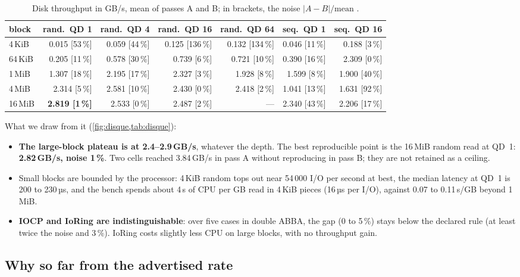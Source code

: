 \begin{table}[ht]
\centering\small
\caption[Disk throughput, excerpt of the ABBA sweep]{Disk throughput in GB/s, mean of passes A and B; in brackets, the noise $|A-B|/\text{mean}$ \mes.}
\label{tab:disque}
\begin{tabular}{@{}lrrrrrr@{}}
\toprule
block & rand.\ QD 1 & rand.\ QD 4 & rand.\ QD 16 & rand.\ QD 64 & seq.\ QD 1 & seq.\ QD 16 \\
\midrule
4\,KiB & 0.015 [53\,\%] & 0.059 [44\,\%] & 0.125 [136\,\%] & 0.132 [134\,\%] & 0.046 [11\,\%] & 0.188 [3\,\%] \\
64\,KiB & 0.205 [11\,\%] & 0.578 [30\,\%] & 0.739 [6\,\%] & 0.721 [10\,\%] & 0.390 [16\,\%] & 2.309 [0\,\%] \\
1\,MiB & 1.307 [18\,\%] & 2.195 [17\,\%] & 2.327 [3\,\%] & 1.928 [8\,\%] & 1.599 [8\,\%] & 1.900 [40\,\%] \\
4\,MiB & 2.314 [5\,\%] & 2.581 [10\,\%] & 2.430 [0\,\%] & 2.418 [2\,\%] & 1.041 [13\,\%] & 1.631 [92\,\%] \\
16\,MiB & \textbf{2.819 [1\,\%]} & 2.533 [0\,\%] & 2.487 [2\,\%] & --- & 2.340 [43\,\%] & 2.206 [17\,\%] \\
\bottomrule
\end{tabular}
\end{table}

What we draw from it (\cref{fig:disque,tab:disque}):
\begin{itemize}
\item \textbf{The large-block plateau is at 2.4--2.9\,GB/s}, whatever the depth. The best reproducible point is the 16\,MiB random read at QD~1: \textbf{2.82\,GB/s, noise 1\,\%}. Two cells reached 3.84\,GB/s in pass A without reproducing in pass B; they are not retained as a ceiling.
\item Small blocks are bounded by the processor: 4\,KiB random tops out near 54\,000 I/O per second at best, the median latency at QD~1 is 200 to 230\,µs, and the bench spends about 4\,s of CPU per GB read in 4\,KiB pieces (16\,µs per I/O), against 0.07 to 0.11\,s/GB beyond 1\,MiB.
\item \textbf{IOCP and IoRing are indistinguishable}: over five cases in double ABBA, the gap (0 to 5\,\%) stays below the declared rule (at least twice the noise and 3\,\%). IoRing costs slightly less CPU on large blocks, with no throughput gain.
\end{itemize}

\subsection{Why so far from the advertised rate}

